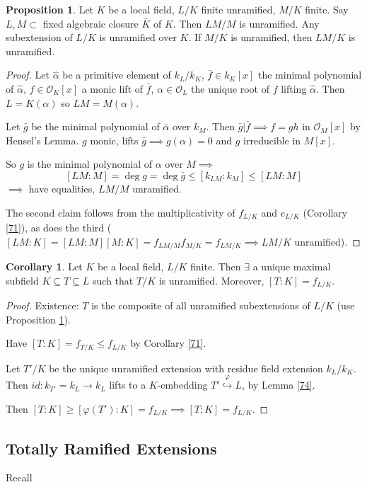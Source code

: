 \documentclass[a4paper]{article}
\theoremstyle{definition}
\theoremstyle{default}
\newtheorem{prop}[definition]{Proposition}
\newtheorem{corollary}[definition]{Corollary}
\theoremstyle{remark}
\begin{document}
\begin{prop}
	Let $K$ be a local field, $L/K$ finite unramified, $M/K$ finite.
	Say $L,M \subset$ fixed algebraic closure $\bar{K}$ of $K$.
	Then $LM/M$ is unramified.
	Any subextension of $L/K$ is unramified over $K$.
	If $M/K$ is unramified, then $LM/K$ is unramified.
	\label{75}
\end{prop}
\begin{proof}
	Let $\hat{\alpha}$ be a primitive element of $k_L/k_K$,
	$\bar{f} \in k_K[x]$ the minimal polynomial of $\hat{\alpha}$,
	$f \in \mathcal{O}_K[x]$ a monic lift of $\bar{f}$,
	$\alpha \in \mathcal{O}_L$ the unique root of $f$ lifting $\hat{\alpha}$.
	Then $L=K(\alpha)$ so $LM=M(\alpha)$.
	
	Let $\bar{g}$ be the minimal polynomial of $\bar{\alpha}$ over $k_M$.
	Then $\bar{g} | \bar{f} \implies f=gh$ in $\mathcal{O}_M[x]$ by Hensel's Lemma.
	$g$ monic, lifts $\bar{g} \implies g(\alpha)=0$ and $g$ irreducible in $M[x]$.
	
	So $g$ is the minimal polynomial of $\alpha$ over $M \implies$
	$$[LM:M] = \deg g = \deg \bar{g} \leq [k_{LM} : k_M] \leq [LM:M]$$
	$\implies$ have equalities, $LM/M$ unramified.
	
	The second claim follows from the multiplicativity of $f_{L/K}$ and $e_{L/K}$ (Corollary \ref{71}),
	as does the third
	($[LM:K] = [LM:M][M:K] = f_{LM/M}f_{M/K} = f_{LM/K} \implies LM/K$ unramified).
\end{proof}


\begin{corollary}
	Let $K$ be a local field, $L/K$ finite.
	Then $\exists$ a unique maximal subfield $K \subseteq T \subseteq L$ such that $T/K$ is unramified. 
	Moreover, $[T:K] = f_{L/K}$.
\end{corollary}
\begin{proof}
	Existence: $T$ is the composite of all unramified subextensions of $L/K$ (use Proposition \ref{75}).
	
	Have $[T:K] = f_{T/K} \leq f_{L/K}$ by Corollary \ref{71}.
	
	Let $T'/K$ be the unique unramified extension with residue field extension $k_L/k_K$.
	Then $id: k_{T'} = k_L \to k_L$ lifts to a $K$-embedding $T' \overset{\varphi}{\hookrightarrow} L$, by Lemma \ref{74}.
	
	Then $[T:K] \geq [\varphi(T'):K] = f_{L/K} \implies [T:K]=f_{L/K}$.
\end{proof}

\subsection{Totally Ramified Extensions}
Recall
\end{document}
